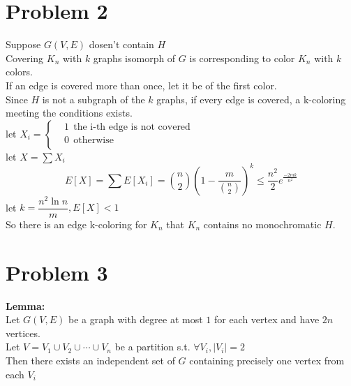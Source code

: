 \documentclass[12pt]{article}
\begin{document}
\section*{Problem 2}
Suppose $G(V,E)$ dosen't contain $H$\\
Covering $K_n$ with $k$ graphs isomorph of $G$ is corresponding to color $K_n$ with $k$ colors.\\
If an edge is covered more than once, let it be of the first color.\\
Since $H$ is not a subgraph of the $k$ graphs, if every edge is covered,  a k-coloring meeting the conditions exists.\\
let 
$
X_i = \left\{
	\begin{aligned}
	&1~~\text{the i-th edge is not covered}\\
	&0~~\text{otherwise}\\
	\end{aligned}
\right.
$\\
let $X=\sum X_i$
$$E[X]=\sum E[X_i]=\binom{n}{2}\left(1-\dfrac{m}{\binom{n}{2}}\right)^k\leq \dfrac{n^2}{2}e^{\frac{-2mk}{n^2}}$$
let $k=\dfrac{n^2\ln n}{m}, E[X]<1$\\
 So there is an edge k-coloring for $K_n$ that $K_n$ contains no monochromatic $H$. 
\section*{Problem 3}
\textbf{Lemma:}\\
Let $G(V,E)$ be a graph with degree at most $1$ for each vertex and have $2n$ vertices. \\
Let $V=V_1\cup V_2 \cup \cdots \cup V_n$ be a partition s.t. $\forall V_i, |V_i|=2$\\
Then there exists an independent set of $G$ containing precisely one vertex from each $V_i$\\
\end{document}

